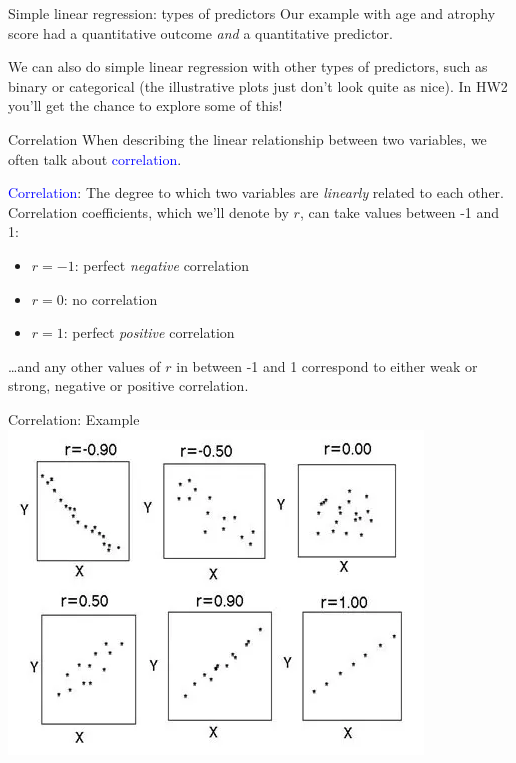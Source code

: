 \documentclass[10pt,t]{beamer}
\begin{document}
\begin{frame}{Simple linear regression: types of predictors}
Our example with age and atrophy score had a quantitative outcome \textit{and} a quantitative predictor. 

\vspace{0.3cm}

We can also do simple linear regression with other types of predictors, such as binary or categorical (the illustrative plots just don't look quite as nice). In HW2 you'll get the chance to explore some of this!
\end{frame}

\begin{frame}{Correlation}
When describing the linear relationship between two variables, we often talk about \textcolor{blue}{correlation}. 

\vspace{0.3cm}

\textcolor{blue}{Correlation}: The degree to which two variables are \textit{linearly} related to each other. Correlation coefficients, which we'll denote by $r$, can take values between -1 and 1:

\vspace{0.3cm} \pause
\begin{itemize}
	\item $r = -1$: perfect \textit{negative} correlation
	\item $r = 0$: no correlation
	\item $r = 1$: perfect \textit{positive} correlation
\end{itemize}

\vspace{0.3cm} \dots and any other values of $r$ in between -1 and 1 correspond to either weak or strong, negative or positive correlation.


\end{frame}

\begin{frame}{Correlation: Example}
	\centering \includegraphics[scale=0.5]{figures/correlation.png}
\end{frame}
\end{document}
